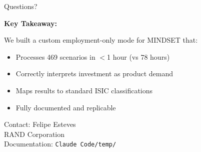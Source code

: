 \documentclass[10pt]{beamer}
\begin{document}

\begin{frame}[plain]
\centering
\vspace{1.5cm}
{\Huge Questions?}

\vspace{1.5cm}

\textbf{Key Takeaway:}

\vspace{0.3cm}

We built a custom employment-only mode for MINDSET that:
\begin{itemize}
    \item Processes 469 scenarios in $<$1 hour (vs 78 hours)
    \item Correctly interprets investment as product demand
    \item Maps results to standard ISIC classifications
    \item Fully documented and replicable
\end{itemize}

\vspace{1cm}

\small
Contact: Felipe Esteves \\
RAND Corporation \\
Documentation: \texttt{Claude Code/temp/}

\end{frame}
\end{document}
